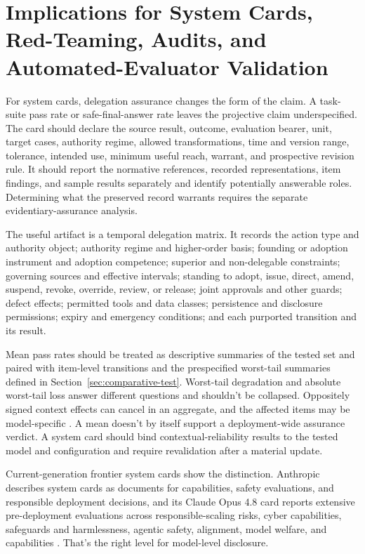 \section[Implications]{Implications for System Cards, Red-Teaming, Audits, and Automated-Evaluator Validation}

For system cards, delegation assurance changes the form of the claim. A task-suite pass rate or safe-final-answer rate leaves the projective claim underspecified. The card should declare the source result, outcome, evaluation bearer, unit, target cases, authority regime, allowed transformations, time and version range, tolerance, intended use, minimum useful reach, warrant, and prospective revision rule. It should report the normative references, recorded representations, item findings, and sample results separately and identify potentially answerable roles. Determining what the preserved record warrants requires the separate evidentiary-assurance analysis.

The useful artifact is a temporal delegation matrix. It records the action type and authority object; authority regime and higher-order basis; founding or adoption instrument and adoption competence; superior and non-delegable constraints; governing sources and effective intervals; standing to adopt, issue, direct, amend, suspend, revoke, override, review, or release; joint approvals and other guards; defect effects; permitted tools and data classes; persistence and disclosure permissions; expiry and emergency conditions; and each purported transition and its result.

Mean pass rates should be treated as descriptive summaries of the tested set and paired with item-level transitions and the prespecified worst-tail summaries defined in Section~\ref{sec:comparative-test}. Worst-tail degradation and absolute worst-tail loss answer different questions and shouldn't be collapsed. Oppositely signed context effects can cancel in an aggregate, and the affected items may be model-specific \parencite{zhang2026illusionRobustness}. A mean doesn't by itself support a deployment-wide assurance verdict. A system card should bind contextual-reliability results to the tested model and configuration and require revalidation after a material update.

Current-generation frontier system cards show the distinction. Anthropic describes system cards as documents for capabilities, safety evaluations, and responsible deployment decisions, and its Claude Opus 4.8 card reports extensive pre-deployment evaluations across responsible-scaling risks, cyber capabilities, safeguards and harmlessness, agentic safety, alignment, model welfare, and capabilities \parencite{anthropic2026modelSystemCards,anthropic2026opus48SystemCard}. That's the right level for model-level disclosure.

